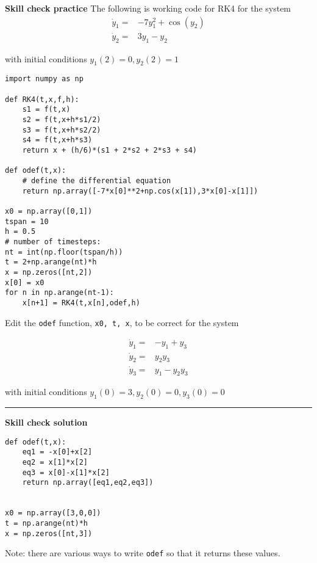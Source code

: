 \documentclass[12pt,letterpaper,noanswers]{exam}
\begin{document}
 \pdfpageheight 11in 
  \pdfpagewidth 8.5in

\noindent 
\noindent \textbf{Skill check practice}
The following is working code for RK4 for the system 
\begin{align*}
\dot{y}_1 =& -7y_1^2 + \cos(y_2) \\
\dot{y}_2 =& 3 y_1 - y_2
\end{align*}

with initial conditions $y_1(2) = 0, y_2(2) = 1$

\begin{lstlisting}
import numpy as np

def RK4(t,x,f,h):
    s1 = f(t,x)
    s2 = f(t,x+h*s1/2)
    s3 = f(t,x+h*s2/2)
    s4 = f(t,x+h*s3)
    return x + (h/6)*(s1 + 2*s2 + 2*s3 + s4)

def odef(t,x):
    # define the differential equation
    return np.array([-7*x[0]**2+np.cos(x[1]),3*x[0]-x[1]])

x0 = np.array([0,1])
tspan = 10
h = 0.5
# number of timesteps:
nt = int(np.floor(tspan/h))
t = 2+np.arange(nt)*h
x = np.zeros([nt,2])
x[0] = x0
for n in np.arange(nt-1):
    x[n+1] = RK4(t,x[n],odef,h)

\end{lstlisting}

Edit the \texttt{odef} function, \texttt{x0, t, x}, to be correct for the system 

\begin{align*}
\dot{y}_1 =& -y_1 + y_3 \\
\dot{y}_2 =& y_2 y_3 \\
\dot{y}_3 =& y_1 - y_2 y_3
\end{align*}

with initial conditions $y_1(0) = 3, y_2(0) = 0, y_3(0) = 0$

\vspace{0.2cm}
\hrule
\vspace{0.2cm}

\noindent \textbf{Skill check solution}

\begin{lstlisting}
def odef(t,x):
    eq1 = -x[0]+x[2]
    eq2 = x[1]*x[2]
    eq3 = x[0]-x[1]*x[2]
    return np.array([eq1,eq2,eq3])


x0 = np.array([3,0,0])
t = np.arange(nt)*h
x = np.zeros([nt,3])
\end{lstlisting}


Note: there are various ways to write \texttt{odef} so that it returns these values.
    
\end{document}
